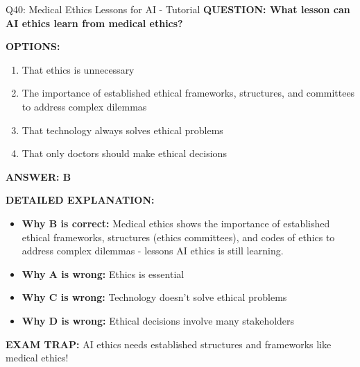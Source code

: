 \documentclass[8pt]{beamer}
\begin{document}
	\begin{frame}{Q40: Medical Ethics Lessons for AI - Tutorial}
		\fontsize{6.5}{7.5}\selectfont
		\textbf{QUESTION: What lesson can AI ethics learn from medical ethics?}
		
		\vspace{0.1cm}
		\textbf{OPTIONS:}
		\begin{enumerate}
			\item That ethics is unnecessary
			\item The importance of established ethical frameworks, structures, and committees to address complex dilemmas
			\item That technology always solves ethical problems
			\item That only doctors should make ethical decisions
		\end{enumerate}
		
		\vspace{0.1cm}
		\textcolor{myblue}{\textbf{ANSWER: B}}
		
		\vspace{0.1cm}
		\textbf{DETAILED EXPLANATION:}
		\begin{itemize}
			\item \textbf{Why B is correct:} Medical ethics shows the importance of established ethical frameworks, structures (ethics committees), and codes of ethics to address complex dilemmas - lessons AI ethics is still learning.
			\item \textbf{Why A is wrong:} Ethics is essential
			\item \textbf{Why C is wrong:} Technology doesn't solve ethical problems
			\item \textbf{Why D is wrong:} Ethical decisions involve many stakeholders
		\end{itemize}
		
		\textcolor{myred}{\textbf{EXAM TRAP:}} AI ethics needs \textcolor{myblue}{established structures and frameworks} like medical ethics!
	\end{frame}
	
	
\end{document}
